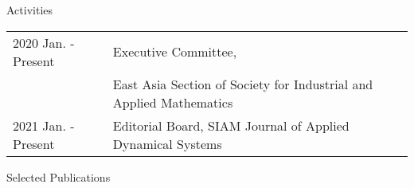 \documentclass[11pt]{jsarticle}
\begin{document}
\newpage

\begin{center}
 {\large \textsf{Activities}}
\end{center}

\hspace*{-4mm}
\begin{tabularx}{23cm}{ll}
2020 Jan. - Present\phantom{hog} & Executive Committee,\\
& East Asia Section of Society for Industrial and Applied Mathematics\\

2021 Jan. - Present & Editorial Board,
SIAM Journal of Applied Dynamical Systems\\
\end{tabularx}

\bigskip
\bigskip

\begin{center}
 {\large \textsf{Selected Publications}}
\end{center}
\end{document}
